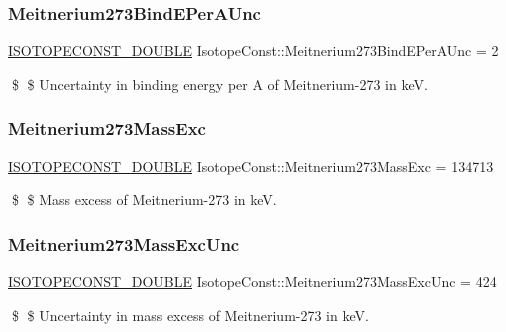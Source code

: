 \subsubsection{\texorpdfstring{Meitnerium273\+Bind\+E\+Per\+A\+Unc}{Meitnerium273BindEPerAUnc}}
{\footnotesize\ttfamily \mbox{\hyperlink{group___isotope_const-_macros_ga8f45a7272ce02c0b4c65c44636ed719a}{I\+S\+O\+T\+O\+P\+E\+C\+O\+N\+S\+T\+\_\+\+D\+O\+U\+B\+LE}} Isotope\+Const\+::\+Meitnerium273\+Bind\+E\+Per\+A\+Unc = 2}

\$ \$ Uncertainty in binding energy per A of Meitnerium-\/273 in keV. \mbox{\label{group___isotope_const-_meitnerium-_mt273_gac78a81b1bf4133362c90c18469fe9b1c}} 
\subsubsection{\texorpdfstring{Meitnerium273\+Mass\+Exc}{Meitnerium273MassExc}}
{\footnotesize\ttfamily \mbox{\hyperlink{group___isotope_const-_macros_ga8f45a7272ce02c0b4c65c44636ed719a}{I\+S\+O\+T\+O\+P\+E\+C\+O\+N\+S\+T\+\_\+\+D\+O\+U\+B\+LE}} Isotope\+Const\+::\+Meitnerium273\+Mass\+Exc = 134713}

\$ \$ Mass excess of Meitnerium-\/273 in keV. \mbox{\label{group___isotope_const-_meitnerium-_mt273_ga3aca66f3e64c1a3d131d84e96a860e5e}} 
\subsubsection{\texorpdfstring{Meitnerium273\+Mass\+Exc\+Unc}{Meitnerium273MassExcUnc}}
{\footnotesize\ttfamily \mbox{\hyperlink{group___isotope_const-_macros_ga8f45a7272ce02c0b4c65c44636ed719a}{I\+S\+O\+T\+O\+P\+E\+C\+O\+N\+S\+T\+\_\+\+D\+O\+U\+B\+LE}} Isotope\+Const\+::\+Meitnerium273\+Mass\+Exc\+Unc = 424}

\$ \$ Uncertainty in mass excess of Meitnerium-\/273 in keV. \mbox{\label{group___isotope_const-_meitnerium-_mt273_gaf8c40d59e96671fcfe4574fe78bfaa36}} 
